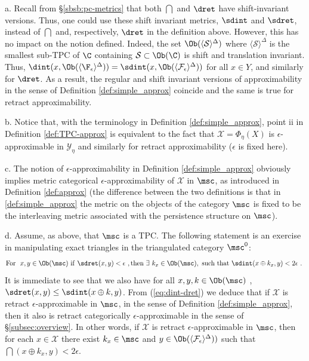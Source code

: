 \begin{rem}\label{rem:relation-TPCapp} a. Recall from \S\ref{sbsb:pc-metrics} that 
both $\dint$ and $\dret$ have
  shift-invariant versions.  Thus, one could use these shift invariant metrics,  $\sdint$ and $\sdret$, instead of $\dint$ and, respectively, $\dret$ in the definition above. However, this has no impact on the notion defined. Indeed, the set $\Ob (\langle \mathcal{S}\rangle ^{\Delta})$ where
  $\langle \mathcal{S} \rangle ^{\Delta}$ is the smallest sub-TPC of
  $\C$ containing $\mathcal{S}\subset \Ob (\C)$ is shift and
  translation invariant. Thus,
  $\dint(x, \Ob (\langle \F_{\epsilon}\rangle^{\Delta})) =\sdint(x,
  \Ob (\langle \mathcal{F}_{\epsilon}\rangle^{\Delta}))$ for all
  $x\in Y$, and similarly for $\dret$.  As a result, the regular and shift
  invariant versions of approximability in the sense of Definition
  \ref{def:simple_approx} coincide and the same is true for retract
  approximability. 
  
  b. Notice that, with the terminology in Definition \ref{def:simple_approx}, point ii in Definition \ref{def:TPC-approx} is equivalent to the fact that $\mathcal{X}=\Phi_{\eta}(X)$ is $\epsilon$-approximable in $\mathscr{Y}_{\eta}$ and similarly for retract approximability ($\epsilon$ is fixed here). 
  
  
  c. The notion of $\epsilon$-approximability
 in Definition \ref{def:simple_approx} obviously implies metric categorical
 $\epsilon$-approximability of $\mathcal{X}$ in $\msc$, as  introduced in Definition \ref{def:approx} (the difference between the two definitions is that in  \ref{def:simple_approx} the metric on the objects of the category $\msc$ is fixed to be the interleaving metric associated with the persistence structure on $\msc$).
 
 d. Assume, as above, that $\msc$ is a TPC.  
  The following statement is an exercise in manipulating exact triangles in the triangulated category $\msc^{0}$:  
  \begin{equation}\label{eq:dint-dret}
  \mathrm{For\ }\  x, y\in \Ob(\msc)\ \mathrm{if}\ \sdret (x,y) <\epsilon \ , \mathrm{then}\ \exists\ k_{x}\in\Ob(\msc),\ \mathrm{such\ that}\  \sdint(x\oplus k_{x},y) < 2\epsilon ~.~
  \end{equation}
It is immediate to see that we also have for all $x,y, k\in \Ob(\msc)$ , $\sdret(x,y)\leq \sdint (x\oplus k,y)$. From (\ref{eq:dint-dret}) we deduce that if $\mathcal{X}$ is retract $\epsilon$-approximable in $\msc$, in the sense of Definition \ref{def:simple_approx}, then it also is retract categorically $\epsilon$-approximable in the sense of \S\ref{subsec:overview}.  In other words, if $\mathcal{X}$ is retract 
$\epsilon$-approximable in $\msc$, then for each $x\in \mathcal{X}$ there exist $k_{x}\in \msc$ and $y\in \Ob (\langle \mathcal{F}_{\epsilon}\rangle^{\Delta}))$ such that $\dint (x\oplus k_{x},y) < 2\epsilon$.


\end{rem}
